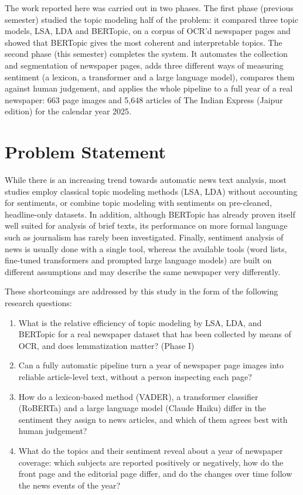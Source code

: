 The work reported here was carried out in two phases. The first phase (previous semester) studied the topic modeling half of the problem: it compared three topic models, LSA, LDA and BERTopic, on a corpus of OCR'd newspaper pages and showed that BERTopic gives the most coherent and interpretable topics. The second phase (this semester) completes the system. It automates the collection and segmentation of newspaper pages, adds three different ways of measuring sentiment (a lexicon, a transformer and a large language model), compares them against human judgement, and applies the whole pipeline to a full year of a real newspaper: 663 page images and 5,648 articles of The Indian Express (Jaipur edition) for the calendar year 2025.

\section{Problem Statement}

While there is an increasing trend towards automatic news text analysis, most studies employ classical topic modeling methods (LSA, LDA) without accounting for sentiments, or combine topic modeling with sentiments on pre-cleaned, headline-only datasets. In addition, although BERTopic has already proven itself well suited for analysis of brief texts, its performance on more formal language such as journalism has rarely been investigated. Finally, sentiment analysis of news is usually done with a single tool, whereas the available tools (word lists, fine-tuned transformers and prompted large language models) are built on different assumptions and may describe the same newspaper very differently.

These shortcomings are addressed by this study in the form of the following research questions:
\begin{enumerate}
\item What is the relative efficiency of topic modeling by LSA, LDA, and BERTopic for a real newspaper dataset that has been collected by means of OCR, and does lemmatization matter? (Phase I)
\item Can a fully automatic pipeline turn a year of newspaper page images into reliable article-level text, without a person inspecting each page?
\item How do a lexicon-based method (VADER), a transformer classifier (RoBERTa) and a large language model (Claude Haiku) differ in the sentiment they assign to news articles, and which of them agrees best with human judgement?
\item What do the topics and their sentiment reveal about a year of newspaper coverage: which subjects are reported positively or negatively, how do the front page and the editorial page differ, and do the changes over time follow the news events of the year?
\end{enumerate}

